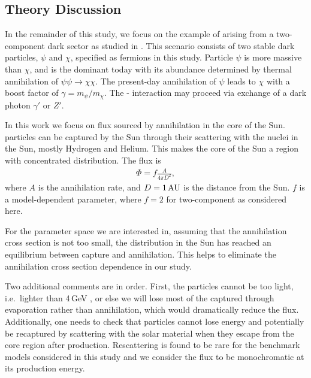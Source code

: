 \subsection{\label{sec:level2}Theory Discussion}
In the remainder of this study, we focus on the example of  arising from a two-component dark sector as studied in \cite{Agashe:2014yua, Berger:2014sqa}. This scenario consists of two stable dark particles, $\psi$ and $\chi$, specified as fermions in this study. Particle $\psi$ is more massive than $\chi$, and is the dominant  today with its abundance determined by thermal annihilation of $\psi\psi\rightarrow\chi\chi$. The present-day annihilation of $\psi$ leads to  $\chi$ with a boost factor of $\gamma = m_\psi/m_\chi$. The - interaction may proceed via exchange of a dark photon $\gamma'$ or $Z'$.

In this work we focus on  flux sourced by  annihilation in the core of the Sun.  particles can be captured by the Sun through their scattering with the nuclei in the Sun, mostly Hydrogen and Helium. This makes the core of the Sun a region with concentrated  distribution. The  flux is
\begin{eqnarray} \label{eq:flux}
\Phi= f \frac{A}{4\pi D^2},
\end{eqnarray}
where $A$ is the annihilation rate, and $D = 1\,\rm{AU}$ is the distance from the Sun. $f$ is a model-dependent parameter, where $f = 2$ for two-component  as considered here.

For the parameter space we are interested in, assuming that the 
 annihilation cross section is not too small, the  distribution in the Sun has reached an equilibrium between capture and annihilation. This helps to eliminate the annihilation cross section dependence in our study.

Two additional comments are in order. First, the  particles cannot be too light, i.e.\ lighter than 4\,GeV \cite{Griest:1986yu,Gould:1987ju}, or else we will lose most of the captured  through evaporation rather than annihilation, which would dramatically reduce the  flux. Additionally, one needs to check that  particles cannot lose energy and potentially be recaptured by scattering with the solar material when they escape from the core region after production. Rescattering is found to be rare for the benchmark models considered in this study and we consider the  flux to be monochromatic at its production energy.

